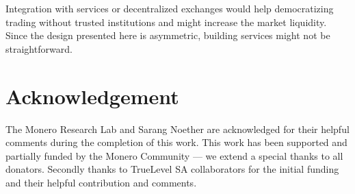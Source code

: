 \documentclass{llncs}
\begin{document}
Integration with services or decentralized exchanges would help democratizing trading without trusted institutions and might increase the market liquidity. Since the design presented here is asymmetric, building services might not be straightforward.

\section{Acknowledgement}
The Monero Research Lab and Sarang Noether are acknowledged for their helpful comments during the completion of this work. This work has been supported and partially funded by the Monero Community --- we extend a special thanks to all donators. Secondly thanks to TrueLevel SA collaborators for the initial funding and their helpful contribution and comments.

%
%
\printbibliography
\end{document}
